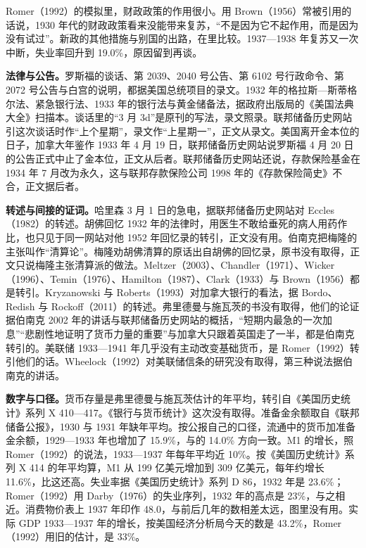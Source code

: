 Romer（1992）的模拟里，财政政策的作用很小。用 Brown（1956）常被引用的话说，1930 年代的财政政策看来没能带来复苏，“不是因为它不起作用，而是因为没有试过”\cite{romer1992}。新政的其他措施与别国的出路，在里比较。1937—1938 年复苏又一次中断，失业率回升到 19.0\%，原因留到再谈\cite{census1975a}。

\begin{deeper}[史料说明]
\textbf{法律与公告。}罗斯福的谈话、第 2039、2040 号公告、第 6102 号行政命令、第 2072 号公告与白宫的说明，都据美国总统项目的录文。1932 年的格拉斯—斯蒂格尔法、紧急银行法、1933 年的银行法与黄金储备法，据政府出版局的《美国法典大全》扫描本。谈话里的“3 月 3d”是原刊的写法，录文照录。联邦储备历史网站引这次谈话时作“上个星期”，录文作“上星期一”，正文从录文。美国离开金本位的日子，加拿大年鉴作 1933 年 4 月 19 日，联邦储备历史网站说罗斯福 4 月 20 日的公告正式中止了金本位，正文从后者。联邦储备历史网站还说，存款保险基金在 1934 年 7 月改为永久，这与联邦存款保险公司 1998 年的《存款保险简史》不合，正文据后者\cite{fdic1998}。

\textbf{转述与间接的证词。}哈里森 3 月 1 日的急电，据联邦储备历史网站对 Eccles（1982）的转述。胡佛回忆 1932 年的法律时，用医生不敢给垂死的病人用药作比，也只见于同一网站对他 1952 年回忆录的转引，正文没有用。伯南克把梅隆的主张叫作“清算论”。梅隆劝胡佛清算的原话出自胡佛的回忆录，原书没有取得，正文只说梅隆主张清算派的做法。Meltzer（2003）、Chandler（1971）、Wicker（1996）、Temin（1976）、Hamilton（1987）、Clark（1933）与 Brown（1956）都是转引。Kryzanowski 与 Roberts（1993）对加拿大银行的看法，据 Bordo、Redish 与 Rockoff（2011）的转述。弗里德曼与施瓦茨的书没有取得，他们的论证据伯南克 2002 年的讲话与联邦储备历史网站的概括，“短期内最急的一次加息”“悲剧性地证明了货币力量的重要”与加拿大只跟着英国走了一半，都是伯南克转引的。美联储 1933—1941 年几乎没有主动改变基础货币，是 Romer（1992）转引他们的话。Wheelock（1992）对美联储信条的研究没有取得，第三种说法据伯南克的讲话。

\textbf{数字与口径。}货币存量是弗里德曼与施瓦茨估计的年平均，转引自《美国历史统计》系列 X 410—417。《银行与货币统计》这次没有取得。准备金余额取自《联邦储备公报》，1930 与 1931 年缺年平均。按公报自己的口径，流通中的货币加准备金余额，1929—1933 年也增加了 15.9\%，与的 14.0\% 方向一致。M1 的增长，照 Romer（1992）的说法，1933—1937 年每年平均近 10\%。按《美国历史统计》系列 X 414 的年平均算，M1 从 199 亿美元增加到 309 亿美元，每年约增长 11.6\%，比这还高。失业率据《美国历史统计》系列 D 86，1932 年是 23.6\%；Romer（1992）用 Darby（1976）的失业序列，1932 年的高点是 23\%，与之相近\cite{romer1992}。消费物价表上 1937 年印作 48.0，与前后几年的数相差太远，图里没有用。实际 GDP 1933—1937 年的增长，按美国经济分析局今天的数是 43.2\%，Romer（1992）用旧的估计，是 33\%。


\end{deeper}
